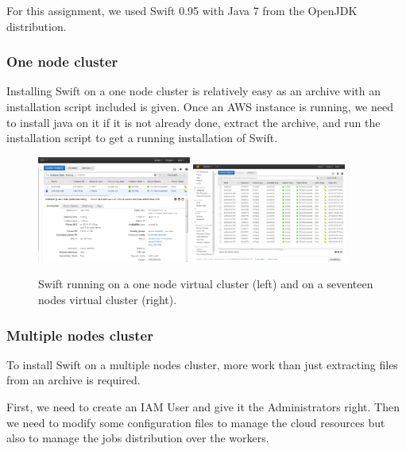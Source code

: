 \documentclass{article}
\begin{document}
For this assignment, we used Swift 0.95 with Java 7 from the OpenJDK distribution.

\subsubsection*{One node cluster}

Installing Swift on a one node cluster is relatively easy as an archive with an installation script included is given. Once an AWS instance is running, we need to install java on it if it is not already done, extract the archive, and run the installation script to get a running installation of Swift.

\begin{figure}[!ht]
   \centering
   \includegraphics[width=0.45\textwidth]{img/swift-one-node.jpg}
   \includegraphics[width=0.45\textwidth]{img/swift-n-nodes.jpg}
\caption{Swift running on a one node virtual cluster (left) and on a seventeen nodes virtual cluster (right).}
\end{figure}

\subsubsection*{Multiple nodes cluster}

To install Swift on a multiple nodes cluster, more work than just extracting files from an archive is required.

First, we need to create an IAM User and give it the Administrators right.
Then we need to modify some configuration files to manage the cloud resources but also to manage the jobs distribution over the workers.
\end{document}
